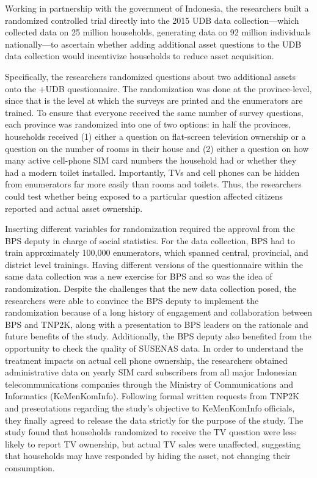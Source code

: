 \documentclass[
]{book}
\begin{document}
Working in partnership with the government of Indonesia, the researchers built a randomized controlled trial directly into the 2015 UDB data collection---which collected data on 25 million households, generating data on 92 million individuals nationally---to ascertain whether adding additional asset questions to the UDB data collection would incentivize households to reduce asset acquisition.

Specifically, the researchers randomized questions about two additional assets onto the +UDB\textbar{} questionnaire. The randomization was done at the province-level, since that is the level at which the surveys are printed and the enumerators are trained. To ensure that everyone received the same number of survey questions, each province was randomized into one of two options: in half the provinces, households received (1) either a question on flat-screen television ownership or a question on the number of rooms in their house and (2) either a question on how many active cell-phone SIM card numbers the household had or whether they had a modern toilet installed. Importantly, TVs and cell phones can be hidden from enumerators far more easily than rooms and toilets. Thus, the researchers could test whether being exposed to a particular question affected citizens reported and actual asset ownership.

Inserting different variables for randomization required the approval from the BPS deputy in charge of social statistics. For the data collection, BPS had to train approximately 100,000 enumerators, which spanned central, provincial, and district level trainings. Having different versions of the questionnaire within the same data collection was a new exercise for BPS and so was the idea of randomization. Despite the challenges that the new data collection posed, the researchers were able to convince the BPS deputy to implement the randomization because of a long history of engagement and collaboration between BPS and TNP2K, along with a presentation to BPS leaders on the rationale and future benefits of the study. Additionally, the BPS deputy also benefited from the opportunity to check the quality of SUSENAS data. In order to understand the treatment impacts on actual cell phone ownership, the researchers obtained administrative data on yearly SIM card subscribers from all major Indonesian telecommunications companies through the Ministry of Communications and Informatics (KeMenKomInfo). Following formal written requests from TNP2K and presentations regarding the study's objective to KeMenKomInfo officials, they finally agreed to release the data strictly for the purpose of the study. The study found that households randomized to receive the TV question were less likely to report TV ownership, but actual TV sales were unaffected, suggesting that households may have responded by hiding the asset, not changing their consumption.
\end{document}
